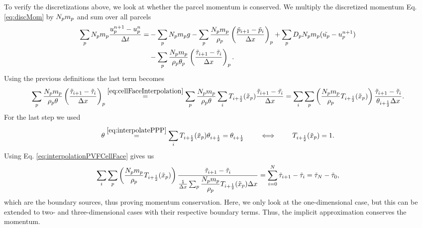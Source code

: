To verify the discretizations above, we look at whether the parcel momentum is conserved. 
We multiply the discretized momentum Eq. \eqref{eq:discMom} by $N_p m_p$  and sum over all parcels
\begin{equation}
\begin{aligned}
    \sum_p N_p m_p \dfrac{u_p^{n+1}-u_p^n}{\Delta t} =& - \sum_p N_p m_p g - \sum_p \dfrac{N_p m_p}{\rho_p} \left( \dfrac{\tilde{p}_{i+1}- \tilde{p}_i}{\Delta x}\right)_p + \sum_p D_p N_p m_p (\tilde{u_p} - u_p^{n+1}) \\
    &- \sum_p \dfrac{N_p m_p}{\rho_p \theta_p} \left( \dfrac{\tilde{\tau}_{i+1}-\tilde{\tau}_i}{\Delta x}\right)_p.
\end{aligned}
\end{equation}
Using the previous definitions the last term becomes
\begin{align}
    \sum_p \dfrac{N_p m_p}{\rho_p \theta} \left( \dfrac{\tilde{\tau}_{i+1}-\tilde{\tau}_i}{\Delta x}\right)_p \stackrel{\eqref{eq:cellFaceInterpolation}}{=} \sum_p \dfrac{N_p m_p}{\rho_p \theta} \sum_i T_{i+\frac{1}{2}}(\tilde{x}_p) \dfrac{\tilde{\tau}_{i+1}-\tilde{\tau_i}}{\Delta x} = \sum_i \sum_p \left( \dfrac{N_p m_p}{\rho_p} T_{i+\frac{1}{2}} ( \tilde{x}_p)\right)\dfrac{\tilde{\tau}_{i+1}- \tilde{\tau}_i}{\theta_{i+\frac{1}{2}} \Delta x}.
\end{align}
For the last step we used
\begin{equation}
    \theta \stackrel{\eqref{eq:interpolatePPP}}{=} \sum_{i}  T_{i+\frac{1}{2}} (\tilde{x}_p) \theta_{i+\frac{1}{2}} = \theta_{i+\frac{1}{2}} \qquad \iff \qquad T_{i+\frac{1}{2}} (\tilde{x}_p) = 1.
\end{equation}
Using Eq. \eqref{eq:interpolationPVFCellFace} gives us
\begin{align}
    \sum_i \sum_p \left( \dfrac{\Np \mp}{\rp} \ifg_{i+\frac{1}{2}} ( \xpp)\right)\dfrac{\tilde{\ss}_{i+1}- \tilde{\ss}_i}{\frac{1}{\Delta \x}\sum_p \dfrac{\Np \mp}{\rp} \ifg_{i+\frac{1}{2}} ( \xpp) \Delta \x} %
    = \sum_{i=0}^{N} \tilde{\ss}_{i+1} - \tilde{\ss}_i = \tilde{\ss}_N - \tilde{\ss}_0,
\end{align}
which are the boundary sources, thus proving momentum conservation.
Here, we only look at the one-dimensional case, but this can be extended to two- and three-dimensional cases with their respective boundary terms. Thus, the implicit approximation conserves the momentum.

